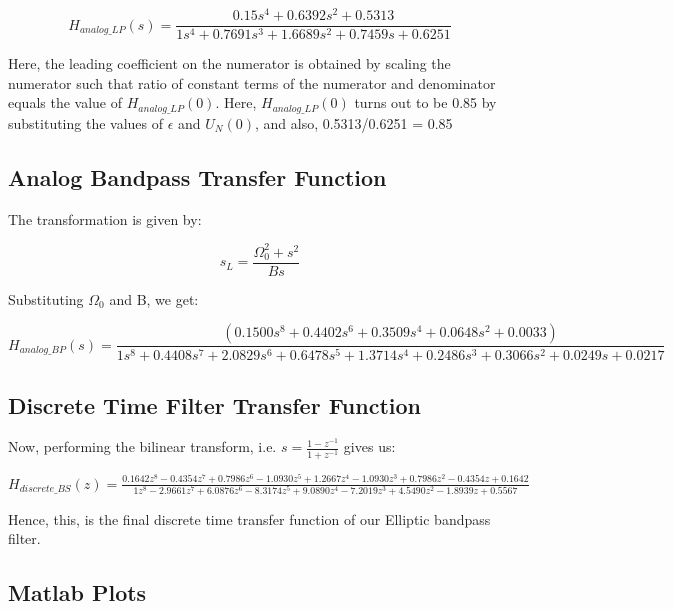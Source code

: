 \documentclass{article}
\begin{document}
\begin{equation}
    H_{analog\_LP}(s) = \frac{0.15s^4 + 0.6392s^2 + 0.5313}{1s^4 + 0.7691s^3 + 1.6689s^2 + 0.7459s + 0.6251}
\end{equation}

Here, the leading coefficient on the numerator is obtained by scaling the numerator such that ratio of constant terms of the numerator and denominator equals the value of $H_{analog\_LP}(0)$. Here, $H_{analog\_LP}(0)$ turns out to be 0.85 by substituting the values of $\epsilon$ and $U_N(0)$, and also, 0.5313/0.6251 = 0.85

\subsection{Analog Bandpass Transfer Function}

The transformation is given by:
\vspace{-5mm}
\begin{center}
    \begin{equation*}
        s_L = \frac{\Omega_0^2+s^2}{Bs}
    \end{equation*}
\end{center}

Substituting $\Omega_0$ and B, we get:

\begin{equation*}
    H_{analog\_BP}(s) =\frac{(0.1500s^8 + 0.4402s^6 + 0.3509s^4 + 0.0648s^2 + 0.0033)}{1s^8 + 0.4408s^7 + 2.0829s^6 + 0.6478s^5 + 1.3714s^4 + 0.2486s^3 + 0.3066s^2 + 0.0249s + 0.0217}
\end{equation*}

\subsection{Discrete Time Filter Transfer Function}

Now, performing the bilinear transform, i.e. $s = \frac{1-z^{-1}}{1+z^{-1}}$ gives us:

\begin{center}
$H_{discrete\_BS}(z) = \frac{0.1642z^8 - 0.4354z^7 + 0.7986z^6 - 1.0930z^5 + 1.2667z^4 - 1.0930z^3 + 0.7986z^2 - 0.4354z + 0.1642}{1z^8 - 2.9661z^7 +  6.0876z^6 - 8.3174z^5 + 9.0890z^4 - 7.2019z^3 + 4.5490z^2 - 1.8939z + 0.5567}$    
\end{center}

Hence, this, is the final discrete time transfer function of our Elliptic bandpass filter.
\clearpage

\subsection{Matlab Plots}
\end{document}
